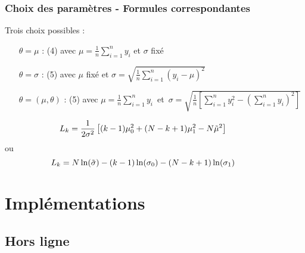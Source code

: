 \documentclass{beamer}
\begin{document}
\begin{frame}
	\frametitle{Choix des paramètres - Formules correspondantes}
	Trois choix possibles :
	\vspace*{.3cm}
	\begin{itemize}
		\item[$\theta=\mu$]: (4) avec $\mu=\frac1n\sum_{i=1}^ny_i$ et $\sigma$ fixé
		\vspace*{.2cm}
		\item[$\theta=\sigma$]:  (5) avec $\mu$ fixé et $\sigma=\sqrt{\frac1n\sum_{i=1}^n(y_i-\mu)^2}$
		\vspace*{.2cm}
		\item[$\theta=(\mu,\theta)$]: (5) avec \mbox{$\mu=\frac1n\sum_{i=1}^ny_i$ et $\sigma=\sqrt{\frac1n\left[\sum_{i=1}^ny_i^2-(\sum_{i=1}^ny_i)^2\right]}$}
	\end{itemize}
	\vspace*{0.8cm}
	\begin{equation}
	\hspace{-1cm}	L_k=\frac 1{2\sigma^2}\left[(k-1)\mu_0^2+(N-k+1)\mu_1^2-N\tilde\mu^2\right]
	\end{equation}
	ou
	\begin{equation}
	\hspace{-1cm}	L_k=N\ln(\tilde\sigma)-(k-1)\ln(\sigma_0)-(N-k+1)\ln(\sigma_1)
	\end{equation}
\end{frame}

\section{Implémentations}

\subsection{Hors ligne}
\end{document}
